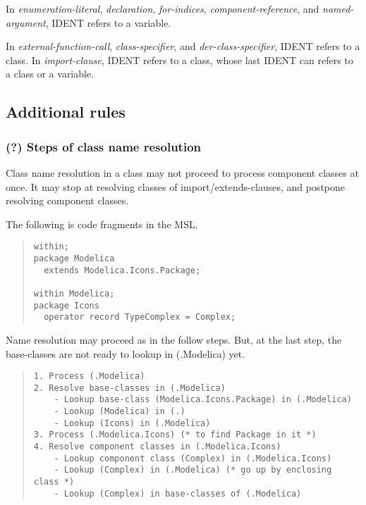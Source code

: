 \documentclass[10pt,b5paper]{article}
\begin{document}
In {\it{}enumeration-literal}, {\it{}declaration}, {\it{}for-indices},
{\it{}component-reference}, and {\it{}named-argument}, IDENT refers to
a variable.

In {\it{}external-function-call}, {\it{}class-specifier}, and
{\it{}der-class-specifier}, IDENT refers to a class.  In
{\it{}import-clause}, IDENT refers to a class, whose last IDENT can
refers to a class or a variable.


\subsection{Additional rules}

\subsubsection*{(?) Steps of class name resolution}

Class name resolution in a class may not proceed to process component
classes at once.  It may stop at resolving classes of
import/extends-clauses, and postpone resolving component classes.

The following is code fragments in the MSL.

\begin{quote}
\begin{lstlisting}[aboveskip=-\baselineskip]
within;
package Modelica
  extends Modelica.Icons.Package;

within Modelica;
package Icons
  operator record TypeComplex = Complex;
\end{lstlisting}
\end{quote}

Name resolution may proceed as in the follow steps.  But, at the last
step, the base-classes are not ready to lookup in (.Modelica) yet.
\begin{quote}
\begin{verbatim}
1. Process (.Modelica)
2. Resolve base-classes in (.Modelica)
    - Lookup base-class (Modelica.Icons.Package) in (.Modelica)
    - Lookup (Modelica) in (.)
    - Lookup (Icons) in (.Modelica)
3. Process (.Modelica.Icons) (* to find Package in it *)
4. Resolve component classes in (.Modelica.Icons)
    - Lookup component class (Complex) in (.Modelica.Icons)
    - Lookup (Complex) in (.Modelica) (* go up by enclosing class *)
    - Lookup (Complex) in base-classes of (.Modelica)
\end{verbatim}
\end{quote}
\end{document}
